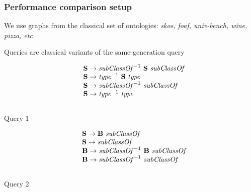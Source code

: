 \documentclass[xcolor=table]{beamer}
\begin{document}
\begin{frame}[fragile] \frametitle{Performance comparison setup}
We use graphs from the classical set of ontologies: \textit{skos, foaf, univ-bench, wine, pizza, etc.}
\\
\vspace{2cm}

Queries are classical variants of the same-generation query

\begin{minipage}{0.47\textwidth}
\begin{center}
   \[
\begin{array}{rl}
  &\textbf{S} \rightarrow \text{\textit{subClassOf}}^{-1} \ \textbf{S} \ \text{\textit{subClassOf}} \\
  &\textbf{S} \rightarrow \text{\textit{type}}^{-1} \ \textbf{S} \ \text{\textit{type}} \\
  &\textbf{S} \rightarrow \text{\textit{subClassOf}}^{-1} \ \text{\textit{subClassOf}} \\
  &\textbf{S} \rightarrow \text{\textit{type}}^{-1} \ \text{\textit{type}} \\
\end{array}
\]
\\
   Query 1
   \end{center}
\end{minipage}
\vspace{2cm}
\begin{minipage} {0.47\textwidth}
   \begin{center}
   \[
\begin{array}{rl}
   &\textbf{S} \rightarrow \textbf{B} \ \text{\textit{subClassOf}} \\
   &\textbf{S} \rightarrow \text{\textit{subClassOf}} \\
   &\textbf{B} \rightarrow \text{\textit{subClassOf}}^{-1} \ \textbf{B} \ \text{\textit{subClassOf}} \\
   &\textbf{B} \rightarrow \text{\textit{subClassOf}}^{-1} \ \text{\textit{subClassOf}} \\
\end{array}
\]
\\
   Query 2
\end{center}
\end{minipage}


\end{frame}
\end{document}
